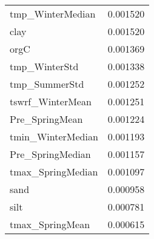 \begin{tabular}{lr}
tmp_WinterMedian & 0.001520 \\
clay & 0.001520 \\
orgC & 0.001369 \\
tmp_WinterStd & 0.001338 \\
tmp_SummerStd & 0.001252 \\
tswrf_WinterMean & 0.001251 \\
Pre_SpringMean & 0.001224 \\
tmin_WinterMedian & 0.001193 \\
Pre_SpringMedian & 0.001157 \\
tmax_SpringMedian & 0.001097 \\
sand & 0.000958 \\
silt & 0.000781 \\
tmax_SpringMean & 0.000615 \\
\bottomrule
\end{tabular}
